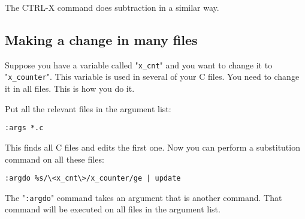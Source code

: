 The CTRL-X command does subtraction in a similar way.
\subsection{Making a change in many files}
Suppose you have a variable called "\texttt{x_cnt}" and you want to change it to "\texttt{x_counter}".
This variable is used in several of your C files.
You need to change it in all files.
This is how you do it.

Put all the relevant files in the argument list:

\begin{Verbatim}[samepage=true]
 :args *.c
\end{Verbatim}
 
This finds all C files and edits the first one.
Now you can perform a substitution command on all these files:

\begin{Verbatim}[samepage=true]
 :argdo %s/\<x_cnt\>/x_counter/ge | update
\end{Verbatim}

The "\texttt{:argdo}" command takes an argument that is another command.
That command will be executed on all files in the argument list.


